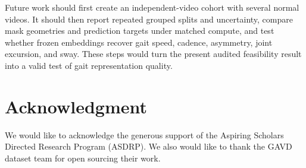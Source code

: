 \documentclass[conference]{IEEEtran}
\begin{document}
Future work should first create an independent-video cohort with several normal videos. It should then report repeated grouped splits and uncertainty, compare mask geometries and prediction targets under matched compute, and test whether frozen embeddings recover gait speed, cadence, asymmetry, joint excursion, and sway. These steps would turn the present audited feasibility result into a valid test of gait representation quality.

\section*{Acknowledgment}
We would like to acknowledge the generous support of the Aspiring Scholars Directed Research Program (ASDRP). We also would like to thank the GAVD dataset team for open sourcing their work.



\end{document}
